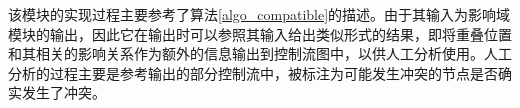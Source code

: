 %
%
%

该模块的实现过程主要参考了算法\ref {algo_compatible}的描述。由于其输入为影响域模块的输出，因此它在输出时可以参照其输入给出类似形式的结果，即将重叠位置和其相关的影响关系作为额外的信息输出到控制流图中，以供人工分析使用。人工分析的过程主要是参考输出的部分控制流中，被标注为可能发生冲突的节点是否确实发生了冲突。




